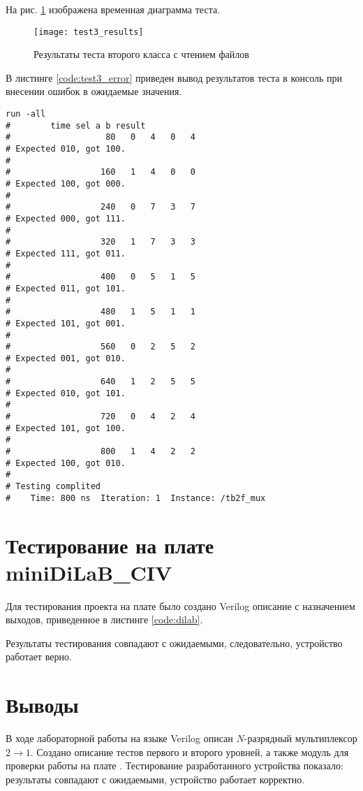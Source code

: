 На рис. \ref{fig:test3_results} изображена временная диаграмма теста.
\begin{figure}[H]
	\begin{center}
		\texttt{[image: test3\_results]}
		\caption{Результаты теста второго класса с чтением файлов}
		\label{fig:test3_results}
	\end{center}
\end{figure}

В листинге \ref{code:test3_error} приведен вывод результатов теста в консоль при внесении ошибок в ожидаемые значения.
\begin{lstlisting}[caption=Результаты ошибочного теста второго класса с чтением файлов, label=code:test3_error, style=console]
run -all
# 		 time sel a b result
#                   80   0   4   0   4
# Expected 010, got 100.
# 
#                  160   1   4   0   0
# Expected 100, got 000.
# 
#                  240   0   7   3   7
# Expected 000, got 111.
# 
#                  320   1   7   3   3
# Expected 111, got 011.
# 
#                  400   0   5   1   5
# Expected 011, got 101.
# 
#                  480   1   5   1   1
# Expected 101, got 001.
# 
#                  560   0   2   5   2
# Expected 001, got 010.
# 
#                  640   1   2   5   5
# Expected 010, got 101.
# 
#                  720   0   4   2   4
# Expected 101, got 100.
# 
#                  800   1   4   2   2
# Expected 100, got 010.
# 
# Testing complited
#    Time: 800 ns  Iteration: 1  Instance: /tb2f_mux
\end{lstlisting}

\section{Тестирование на плате miniDiLaB\_CIV}

Для тестирования проекта на плате было создано Verilog описание с назначением выходов, приведенное в листинге  \ref{code:dilab}.


Результаты тестирования совпадают с ожидаемыми, следовательно, устройство работает верно.

\section{Выводы}

В ходе лабораторной работы на языке Verilog описан $N$-разрядный мультиплексор $2 \rightarrow 1$. Создано описание тестов первого и второго уровней, а также модуль для проверки работы на плате . Тестирование разработанного устройства показало: результаты совпадают с ожидаемыми, устройство работает корректно.

